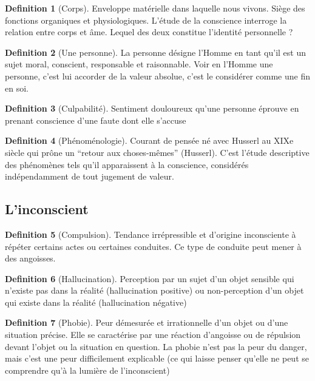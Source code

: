 \documentclass[french]{book}
\theoremstyle{definition}
\newtheorem*{dfn}{Definition}
\begin{document}
\begin{dfn}[Corps]
Enveloppe matérielle dans laquelle nous vivons. Siège des fonctions organiques et physiologiques. L’étude de la conscience interroge la relation entre corps et âme. Lequel des deux constitue l’identité personnelle ?
\end{dfn}

\begin{dfn}[Une personne]
La personne désigne l’Homme en tant qu’il est un sujet moral, conscient, responsable et raisonnable. Voir en l’Homme une personne, c’est lui accorder de la valeur absolue, c’est le considérer comme une fin en soi.
\end{dfn}


\begin{dfn}[Culpabilité]
Sentiment douloureux qu’une personne éprouve en prenant conscience d’une faute dont elle s’accuse
\end{dfn}


\begin{dfn}[Phénoménologie]
Courant de pensée né avec Husserl au XIXe siècle qui prône un “retour aux choses-mêmes” (Husserl). C’est l’étude descriptive des phénomènes tels qu’il apparaissent à la conscience, considérés indépendamment de tout jugement de valeur.
\end{dfn}

\subsection{L’inconscient}

\begin{dfn}[Compulsion]
Tendance irrépressible et d’origine inconsciente à répéter certains actes ou certaines conduites. Ce type de conduite peut mener à des angoisses.
\end{dfn}

\begin{dfn}[Hallucination]
Perception par un sujet d’un objet sensible qui n’existe pas dans la réalité (hallucination positive) ou non-perception d’un objet qui existe dans la réalité (hallucination négative)
\end{dfn}

\begin{dfn}[Phobie]
Peur démesurée et irrationnelle d’un objet ou d’une situation précise. Elle se caractérise par une réaction d’angoisse ou de répulsion devant l’objet ou la situation en question. La phobie n’est pas la peur du danger, mais c’est une peur difficilement explicable (ce qui laisse penser qu’elle ne peut se comprendre qu’à la lumière de l'inconscient)
\end{dfn}
\end{document}
